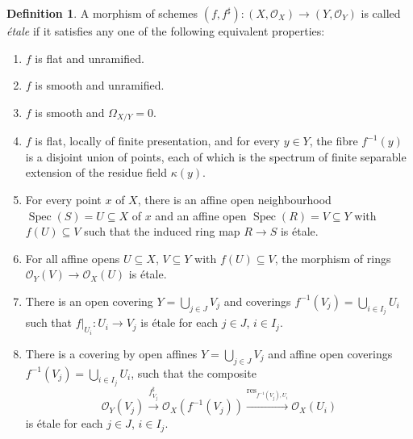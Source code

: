 \documentclass{article}
\def\~#1{\mathscr{#1}}
\def\To#1{\xrightarrow{#1}}
\numberwithin{equation}{section}
\numberwithin{figure}{section}
\newcommand{\Spec}{\mathop{\mathrm{Spec}}}
\newcommand{\res}{\mathrm{res}}
\theoremstyle{plain}
\theoremstyle{definition}
\newtheorem{defn}[thm]{Definition}
\theoremstyle{remark}
\begin{document}
\begin{defn}\label{def:etale}
    A morphism of schemes $(f, f^\sharp): (X, \~O_X) \to (Y, \~O_Y)$ is called \emph{\'etale} if it satisfies any one of the following equivalent properties:
    \begin{enumerate}
        \item $f$ is flat and unramified. 
        \item $f$ is smooth and unramified.
        \item $f$ is smooth and $\Omega_{X/Y} = 0$.
        \item \label{et3} $f$ is flat, locally of finite presentation, and for every $y \in Y$, the fibre $f^{-1}(y)$ is a disjoint union of points, each of which is the spectrum of finite separable extension of the residue field $\kappa(y)$.
        \item For every point $x$ of $X$, there is an affine open neighbourhood $\Spec(S) = U \subseteq X$ of $x$ and an affine open $\Spec(R) = V \subseteq Y$ with $f(U) \subseteq V$ such that the induced ring map $R \to S$ is \'etale. 
        \item For all affine opens $U \subseteq X$, $V \subseteq Y$ with $f(U) \subseteq V$, the morphism of rings $\~O_Y(V) \to \~O_X(U)$ is \'etale.
        \item There is an open covering $Y = \bigcup_{j \in J} V_j$ and coverings $f^{-1}(V_j) = \bigcup_{i \in I_j}U_i$ such that $f|_{U_i}: U_i \to V_j$ is \'etale for each $j \in J$, $i \in I_j$.
        \item There is a covering by open affines $Y = \bigcup_{j \in J} V_j$ and affine open coverings $f^{-1}(V_j) = \bigcup_{i \in I_j} U_i$, such that the composite
        \[\~O_Y(V_j) \To{f_{V_j}^\sharp} \~O_X(f^{-1}(V_j)) \To{\res_{f^{-1}(V_j), U_i}} \~O_X(U_i)\]
        is \'etale for each $j \in J$, $i \in I_j$.
    \end{enumerate}
\end{defn}
\end{document}
